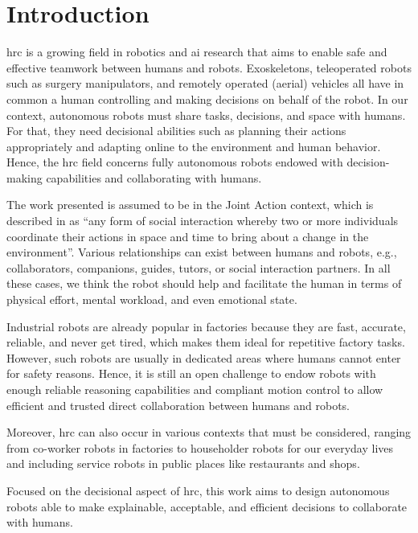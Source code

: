 \cleardoublepage

\chapter*{Introduction}


\minitoc

\acrfull{hrc} is a growing field in robotics and \acrfull{ai} research that aims to enable safe and effective teamwork between humans and robots.
Exoskeletons, teleoperated robots such as surgery manipulators, and remotely operated (aerial) vehicles all have in common a human controlling and making decisions on behalf of the robot. In our context, autonomous robots must share tasks, decisions, and space with humans. For that, they need decisional abilities such as planning their actions appropriately and adapting online to the environment and human behavior. Hence, the \acrshort{hrc} field concerns fully autonomous robots endowed with decision-making capabilities and collaborating with humans.

The work presented is assumed to be in the Joint Action context, which is described in \cite{sebanz_joint_2006} as ``any form of social interaction whereby two or more individuals coordinate their actions in space and time to bring about a change in the environment''. Various relationships can exist between humans and robots, e.g., collaborators, companions, guides, tutors, or social interaction partners. In all these cases, we think the robot should help and facilitate the human in terms of physical effort, mental workload, and even emotional state.

Industrial robots are already popular in factories because they are fast, accurate, reliable, and never get tired, which makes them ideal for repetitive factory tasks. 
However, such robots are usually in dedicated areas where humans cannot enter for safety reasons. 
Hence, it is still an open challenge to endow robots with enough reliable reasoning capabilities and compliant motion control to allow efficient and trusted direct collaboration between humans and robots. 

Moreover, \acrshort{hrc} can also occur in various contexts that must be considered, ranging from co-worker robots in factories to householder robots for our everyday lives and including service robots in public places like restaurants and shops.

Focused on the decisional aspect of \acrshort{hrc}, this work aims to design autonomous robots able to make explainable, acceptable, and efficient decisions to collaborate with humans. 

